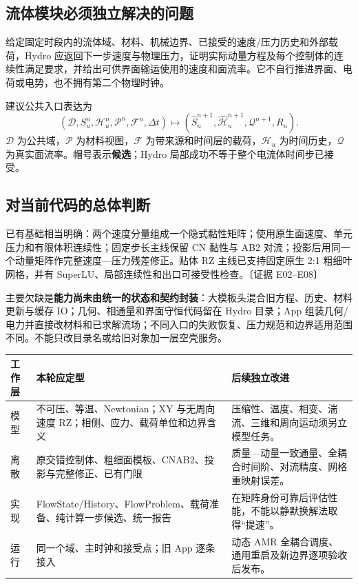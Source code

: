 \documentclass[UTF8,a4paper,11pt,fontset=fandol]{ctexart}
\newcommand{\ev}[1]{{\small\color{muted}〔证据 #1〕}}
\newcommand{\dt}{\Delta t}\newcommand{\jump}[1]{[\![#1]\!]}
\begin{document}
\subsection{流体模块必须独立解决的问题}
给定固定时段内的流体域、材料、机械边界、已接受的速度/压力历史和外部载荷，Hydro 应返回下一步速度与物理压力，证明实际动量方程及每个控制体的连续性满足要求，并给出可供界面输运使用的速度和面流率。它不自行推进界面、电荷或电势，也不拥有第二个物理时钟。

建议公共入口表达为
\[
 (\mathcal D,S_u^n,\mathcal H_u^n,\mathcal P^n,\mathcal F^n,\dt)
 \longmapsto(\widehat S_u^{n+1},\widehat{\mathcal H}_u^{n+1},\mathcal Q^{n+1},R_u).
\]
$\mathcal D$ 为公共域，$\mathcal P$ 为材料视图，$\mathcal F$ 为带来源和时间层的载荷，$\mathcal H_u$ 为时间历史，$\mathcal Q$ 为真实面流率。帽号表示\textbf{候选}；Hydro 局部成功不等于整个电流体时间步已接受。

\subsection{对当前代码的总体判断}
已有基础相当明确：两个速度分量组成一个隐式黏性矩阵；使用原生面速度、单元压力和有限体积连续性；固定步长主线保留 CN 黏性与 AB2 对流；投影后用同一个动量矩阵作完整速度—压力残差修正。贴体 RZ 主线已支持固定原生 2:1 粗细叶网格，并有 SuperLU、局部连续性和出口可接受性检查。\ev{E02--E08}

主要欠缺是\textbf{能力尚未由统一的状态和契约封装}：大模板头混合旧方程、历史、材料更新与缓存 IO；几何、相通量和界面守恒代码留在 Hydro 目录；App 组装几何/电力并直接改材料和已求解流场；不同入口的失败恢复、压力规范和边界适用范围不同。不能只改目录名或给旧对象加一层空壳服务。

\begin{longtable}{@{}P{.19\textwidth}P{.37\textwidth}P{.38\textwidth}@{}}
\toprule 工作层 & 本轮应定型 & 后续独立改进\\\midrule\endhead
模型 & 不可压、等温、Newtonian；XY 与无周向速度 RZ；相侧、应力、载荷单位和边界含义 & 压缩性、温度、相变、湍流、三维和周向运动须另立模型任务。\\
离散 & 原交错控制体、粗细面模板、CNAB2、投影与完整修正、已有门限 & 质量—动量一致通量、全耦合时间阶、对流精度、网格重映射误差。\\
实现 & FlowState/History、FlowProblem、载荷准备、纯计算一步候选、统一报告 & 在矩阵身份可靠后评估性能，不能以静默换解法取得“提速”。\\
运行 & 同一个域、主时钟和接受点；旧 App 逐条接入 & 动态 AMR 全耦合调度、通用重启及新边界逐项验收后发布。\\
\bottomrule
\end{longtable}
\end{document}
